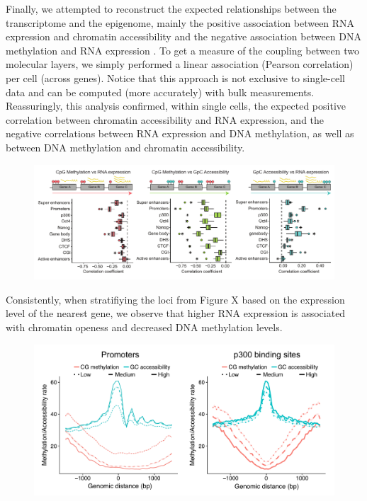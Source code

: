 Finally, we attempted to reconstruct the expected relationships between the transcriptome and the epigenome, mainly the positive association between RNA expression and chromatin accessibility and the negative association between DNA methylation and RNA expression \cite{Thurman2012,Angermueller2016,XXX}. To get a measure of the coupling between two molecular layers, we simply performed a linear association (Pearson correlation) per cell (across genes). Notice that this approach is not exclusive to single-cell data and can be computed (more accurately) with bulk measurements. Reassuringly, this analysis confirmed, within single cells, the expected positive correlation between chromatin accessibility and RNA expression, and the negative correlations between RNA expression and DNA methylation, as well as between DNA methylation and chromatin accessibility.

\begin{figure}[H]
	\centering
	\includegraphics[width=1.0\linewidth]{scNMT_correlations_acrossgenes}
	\caption[]{}
	\label{fig:scNMT_correlations_acrossgenes}
\end{figure}


Consistently, when stratifiying the loci from Figure X based on the expression level of the nearest gene, we observe that higher RNA expression is associated with chromatin openess and decreased DNA methylation levels. 
\begin{figure}[H]
	\centering
	\includegraphics[width=1.0\linewidth]{scNMT_pseudobulk_profiles_byexpr}
	\caption[]{}
	\label{fig:scnmt_pseudobulk_profiles_byexpr}
\end{figure}


